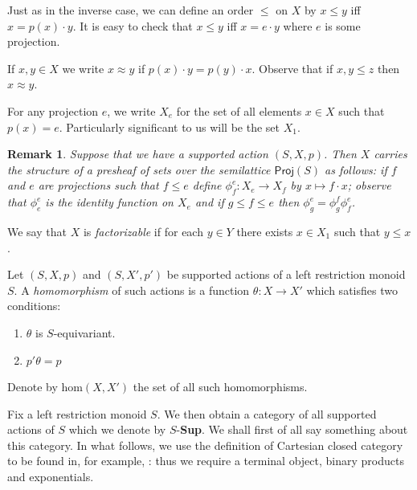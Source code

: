 \documentclass[a4paper]{amsart}
\newtheorem{remark}[theorem]{Remark}
\begin{document}
Just as in the inverse case, we can define an order $\leq$ on $X$ by $x \leq y$ iff $x = p(x) \cdot y$.
It is easy to check that $x \leq y$ iff $x = e \cdot y$ where $e$ is some projection.

If $x,y \in X$ we write $x \approx y$ if $p(x) \cdot y = p(y) \cdot x$.
Observe that if $x,y \leq z$ then $x \approx y$.

For any projection $e$, we write $X_{e}$ for the set of all elements $x \in X$ such that $p(x) = e$.
Particularly significant to us will be the set $X_{1}$.

\begin{remark}{\em Suppose that we have a supported action $(S,X,p)$.
Then $X$ carries the structure of a presheaf of sets over the semilattice $\mathsf{Proj}(S)$ as follows:
if $f$ and $e$ are projections such that $f \leq e$ define $\phi^{e}_{f} \colon X_{e} \rightarrow X_{f}$ by $x \mapsto f \cdot x$;
observe that $\phi^{e}_{e}$ is the identity function on $X_{e}$ and if $g \leq f \leq e$ then $\phi^{e}_{g} = \phi^{f}_{g}\phi^{e}_{f}$.}
\end{remark}

We say that $X$ is {\em factorizable} if for each $y \in Y$ there exists $x \in X_{1}$
such that $y \leq x$.

Let $(S,X,p)$ and $(S,X',p')$ be supported actions of a left restriction monoid $S$.
A {\em homomorphism} of such actions is a function $\theta \colon X \rightarrow X'$ 
which satisfies two conditions:
\begin{enumerate}
\item $\theta$ is $S$-equivariant. 
\item $p' \theta = p$ 
\end{enumerate}
Denote by $\mbox{hom}(X,X')$ the set of all such homomorphisms.

Fix a left restriction monoid $S$.
We then obtain a category of all supported actions of $S$ which we denote by $S$-{\bf Sup}.
We shall first of all say something about this category.
In what follows, 
we use the definition of Cartesian closed category to be found in, for example, \cite{BW}: 
thus we require a terminal object,
binary products and exponentials.
\end{document}

